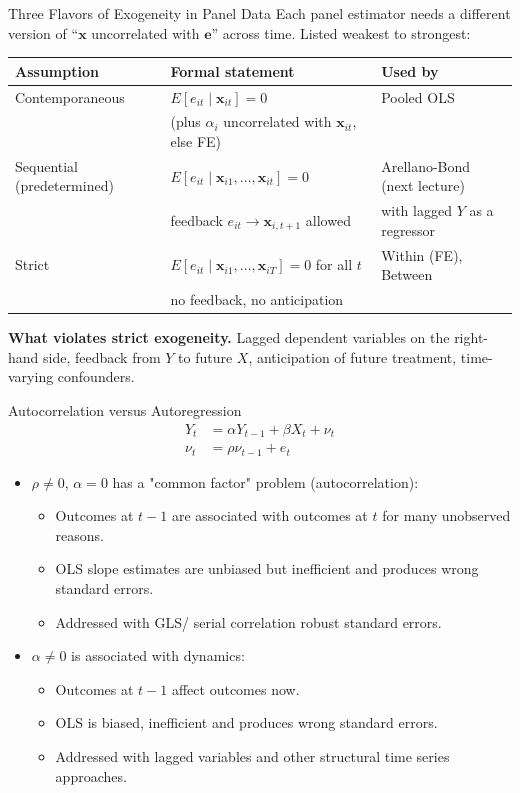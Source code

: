 \documentclass[aspectratio=169, handout]{beamer}
\numberwithin{equation}{section}
\begin{document}
\begin{frame}{Three Flavors of Exogeneity in Panel Data}
Each panel estimator needs a different version of ``$\bm{x}$ uncorrelated with $\bm{e}$'' across time. Listed weakest to strongest:\\[4pt]

\centering
\small
\begin{tabular}{@{}p{3.3cm}p{5.6cm}p{4.6cm}@{}}
\toprule
\textbf{Assumption} & \textbf{Formal statement} & \textbf{Used by} \\
\midrule
Contemporaneous & $E[e_{it}\mid\bm{x}_{it}]=0$ & Pooled OLS \\
 & (plus $\alpha_i$ uncorrelated with $\bm{x}_{it}$, else FE) & \\[6pt]
Sequential (predetermined) & $E[e_{it}\mid\bm{x}_{i1},\ldots,\bm{x}_{it}]=0$ & Arellano-Bond (next lecture) \\
 & feedback $e_{it}\to\bm{x}_{i,t+1}$ allowed & with lagged $Y$ as a regressor\\[6pt]
Strict & $E[e_{it}\mid\bm{x}_{i1},\ldots,\bm{x}_{iT}]=0$ for all $t$ & Within (FE), Between \\
 & no feedback, no anticipation & \\
\bottomrule
\end{tabular}

\vspace{8pt}
\flushleft
\textbf{What violates strict exogeneity.} Lagged dependent variables on the right-hand side, feedback from $Y$ to future $X$, anticipation of future treatment, time-varying confounders.
\end{frame}

\begin{frame}{Autocorrelation versus Autoregression}
\begin{align*}
Y_t&=\alpha Y_{t-1}+\beta X_t+\nu_t\\
\nu_t&=\rho \nu_{t-1}+e_t
\end{align*}
\begin{itemize}\pause
\item $\rho\neq 0$, $\alpha = 0$ has a "common factor" problem (autocorrelation): 
\begin{itemize}
\item Outcomes at $t-1$ are associated with outcomes at $t$ for many unobserved reasons.
\item OLS slope estimates are unbiased but inefficient and produces wrong standard errors.
\item Addressed with GLS/ serial correlation robust standard errors. \pause
\end{itemize}
\item $\alpha \neq 0$ is associated with dynamics: 
\begin{itemize}
\item Outcomes at $t-1$ affect outcomes now.
\item OLS is biased, inefficient and produces wrong standard errors. 
\item Addressed with lagged variables and other structural time series approaches.
\end{itemize}
\end{itemize}
\end{frame}
\end{document}
